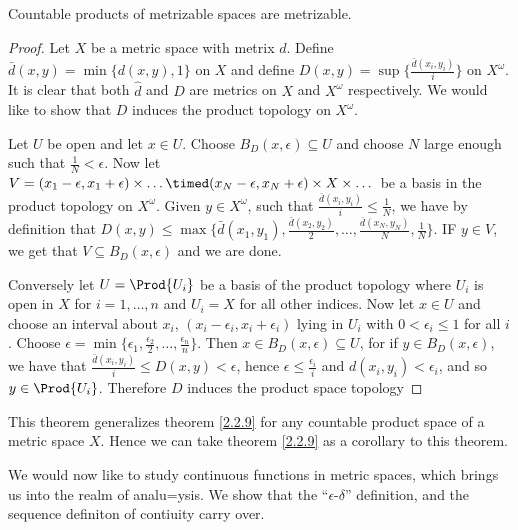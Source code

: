 \begin{theorem}\label{2.3.3}
    Countable products of metrizable spaces are metrizable.
\end{theorem}
\begin{proof}
    Let $X$ be a metric space with metrix  $d$. Define
    $\bar{d}(x,y)=\min\{d(x,y),1\}$ on $X$ and define  $D(x,y)=\sup\{\frac{\bar{d}(x_i,y_i)}{i}\}$
    on $X^{\omega}$. It is clear that both $\hat{d}$ and $D$ are metrics on  $X$ and  $X^{\omega}$
    respectively. We would like to show that $D$ induces the product topology on  $X^{\omega}$.

    Let $U$ be open and let  $x \in U$. Choose  $B_D(x,\epsilon) \subseteq U$ and choose $N$ large
    enough such that  $ \frac{1}{N}<\epsilon$. Now let $V=(x_1-\epsilon,x_1+\epsilon) \times \dots
    \timed (x_N-\epsilon,x_N+\epsilon) \times X \times \dots$ be a basis in the product topology on
    $X^{\omega}$. Given $y \in X^{\omega}$, such that $\frac{\bar{d}(x_i,y_i)}{i} \leq
    \frac{1}{N}$, we have by definition that $D(x,y) \leq \max\{\bar{d}(x_1,y_1),
    \frac{\bar{d}(x_2,y_2)}{2}, \dots, \frac{\bar{d}(x_N,y_N)}{N}, \frac{1}{N}\}$. IF $y \in V$, we
    get that  $V \subseteq B_D(x,\epsilon)$ and we are done.

    Conversely let $U=\Prod{U_i}$ be a basis of the product topology where $U_i$ is open in  $X$
    for  $i=1,\dots,n$ and  $U_i=X$ for all other indices. Now let  $x \in U$ and choose an interval
    about  $x_i$,  $(x_i-\epsilon_i,x_i+\epsilon_i)$ lying in $U_i$ with  $0<\epsilon_i \leq 1$ for
    all  $i$. Choose  $\epsilon=\min\{\epsilon_1,\frac{\epsilon_2}{2}, \dots,
    \frac{\epsilon_n}{n}\}$. Then  $x \in B_D(x,\epsilon) \subseteq U$, for if $y \in
    B_D(x,\epsilon)$, we have that $\frac{\bar{d}(x_i,y_i)}{i} \leq D(x,y)<\epsilon$, hence
    $\epsilon \leq \frac{\epsilon_i}{i}$ and $d(x_i,y_i)<\epsilon_i$, and so $y \in \Prod{U_i}$.
    Therefore $D$ induces the product space topology
\end{proof}
\begin{remark} 
    This theorem generalizes theorem \ref{2.2.9} for any countable product space of a metric space
    $X$. Hence we can take theorem \ref {2.2.9} as a corollary to this theorem.		
\end{remark}

We would now like to study continuous functions in metric spaces, which brings us into the realm of
analu=ysis. We show that the ``$\epsilon$-$\delta$'' definition, and the sequence definiton of
contiuity carry over.

